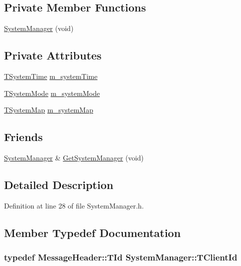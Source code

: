 \subsection*{Private Member Functions}
\begin{DoxyCompactItemize}
\item 
\hyperlink{class_system_manager_a7654b10e671b56945ff0958781e07a6f}{System\-Manager} (void)
\end{DoxyCompactItemize}
\subsection*{Private Attributes}
\begin{DoxyCompactItemize}
\item 
\hyperlink{class_system_manager_a9743ff4f23e7d957f5932780d8070099}{T\-System\-Time} \hyperlink{class_system_manager_af5a7fec3622669af269cbcf7b1b2af22}{m\-\_\-system\-Time}
\item 
\hyperlink{class_system_manager_aa32b3f50b8882c8aa7a9ca88ab7a43dd}{T\-System\-Mode} \hyperlink{class_system_manager_a25bf998fe8f48168e2ad4c3dfd3bad91}{m\-\_\-system\-Mode}
\item 
\hyperlink{class_system_manager_aae66953e62823ae14519c7e9b3925864}{T\-System\-Map} \hyperlink{class_system_manager_a74a1b7e836ad95da039de9eb367544c3}{m\-\_\-system\-Map}
\end{DoxyCompactItemize}
\subsection*{Friends}
\begin{DoxyCompactItemize}
\item 
\hyperlink{class_system_manager}{System\-Manager} \& \hyperlink{class_system_manager_a97e64f74d188d41051488578800d20cd}{Get\-System\-Manager} (void)
\end{DoxyCompactItemize}


\subsection{Detailed Description}


Definition at line 28 of file System\-Manager.\-h.



\subsection{Member Typedef Documentation}
\hypertarget{class_system_manager_af957fc0ff78c4c38085c26ac0d81064e}{
\subsubsection[{T\-Client\-Id}]{\setlength{\rightskip}{0pt plus 5cm}typedef {\bf Message\-Header\-::\-T\-Id} {\bf System\-Manager\-::\-T\-Client\-Id}}}\label{class_system_manager_af957fc0ff78c4c38085c26ac0d81064e}



